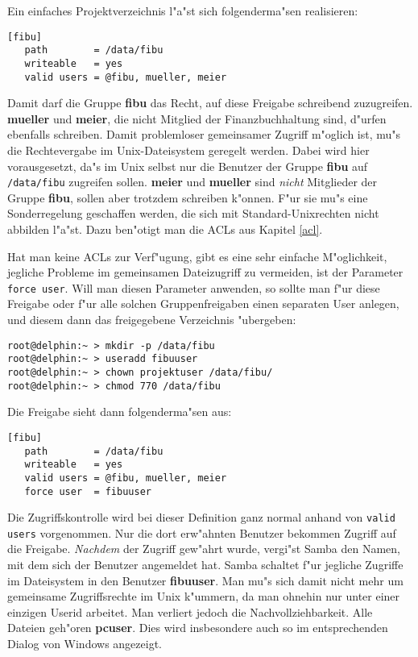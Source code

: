 \documentclass{scrartcl}\usepackage{pslatex}\typearea{12}
\newcommand{\param}{\texttt}
\newcommand{\dateistyle}{\texttt}
\newcommand{\username}{\textbf}
\begin{document}
Ein einfaches Projektverzeichnis l"a"st sich folgenderma"sen
realisieren:

\begin{verbatim}
[fibu]
   path        = /data/fibu
   writeable   = yes
   valid users = @fibu, mueller, meier
\end{verbatim}

Damit darf die Gruppe \username{fibu} das Recht, auf diese Freigabe
schreibend zuzugreifen. \username{mueller} und \username{meier}, die
nicht Mitglied der Finanzbuchhaltung sind, d"urfen ebenfalls
schreiben.  Damit problemloser gemeinsamer Zugriff m"oglich ist, mu"s
die Rechtevergabe im Unix-Dateisystem geregelt werden. Dabei wird hier
vorausgesetzt, da"s im Unix selbst nur die Benutzer der Gruppe
\username{fibu} auf \dateistyle{/data/fibu} zugreifen sollen.
\username{meier} und \username{mueller} sind \emph{nicht} Mitglieder
der Gruppe \username{fibu}, sollen aber trotzdem schreiben k"onnen.
F"ur sie mu"s eine Sonderregelung geschaffen werden, die sich mit
Standard-Unixrechten nicht abbilden l"a"st. Dazu ben"otigt man die
ACLs aus Kapitel \ref{acl}.

Hat man keine ACLs zur Verf"ugung, gibt es eine sehr einfache
M"oglichkeit, jegliche Probleme im gemeinsamen Dateizugriff zu
vermeiden, ist der Parameter \param{force user}. Will man diesen
Parameter anwenden, so sollte man f"ur diese Freigabe oder f"ur alle
solchen Gruppenfreigaben einen separaten User anlegen, und diesem dann
das freigegebene Verzeichnis "ubergeben:

\begin{verbatim}
root@delphin:~ > mkdir -p /data/fibu
root@delphin:~ > useradd fibuuser
root@delphin:~ > chown projektuser /data/fibu/
root@delphin:~ > chmod 770 /data/fibu
\end{verbatim}

Die Freigabe sieht dann folgenderma"sen aus:

\begin{verbatim}
[fibu]
   path        = /data/fibu
   writeable   = yes
   valid users = @fibu, mueller, meier
   force user  = fibuuser
\end{verbatim}

Die Zugriffskontrolle wird bei dieser Definition ganz normal anhand
von \param{valid users} vorgenommen. Nur die dort erw"ahnten Benutzer
bekommen Zugriff auf die Freigabe. \emph{Nachdem} der Zugriff gew"ahrt
wurde, vergi"st Samba den Namen, mit dem sich der Benutzer angemeldet
hat. Samba schaltet f"ur jegliche Zugriffe im Dateisystem in den
Benutzer \username{fibuuser}. Man mu"s sich damit nicht mehr um
gemeinsame Zugriffsrechte im Unix k"ummern, da man ohnehin nur unter
einer einzigen Userid arbeitet. Man verliert jedoch die
Nachvollziehbarkeit. Alle Dateien geh"oren \username{pcuser}. Dies
wird insbesondere auch so im entsprechenden Dialog von Windows
angezeigt.
\end{document}
